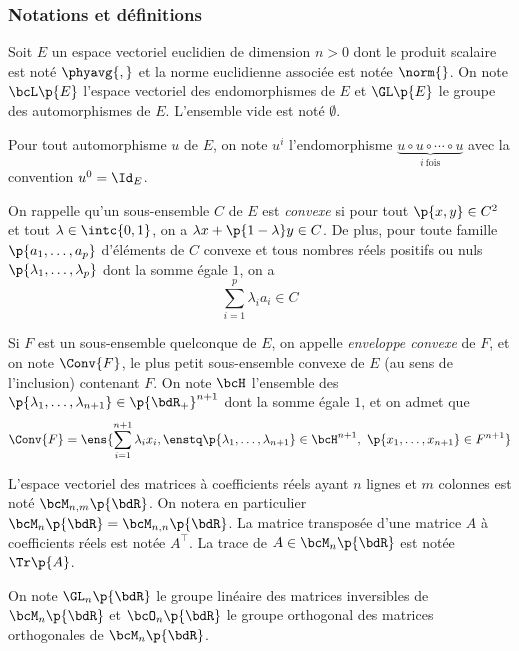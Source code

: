 \documentclass[a4paper,french,bookmarks]{article}
\begin{document}
    \renewcommand{\thesection}{\Roman{section}}
    \renewcommand{\thesubsection}{\Roman{section}.\Alph{subsection}}
    \renewcommand{\labelenumi}{\thesection.\arabic{enumi}.}
    \renewcommand*{\labelenumii}{\alph{enumii})}

    
    \subsubsection*{Notations et définitions}
    
    \begin{enumerate}
        \itt Soit $E$ un espace vectoriel euclidien de dimension $n > 0$ dont le produit scalaire est noté $\phyavg{,}$ et la norme euclidienne associée est notée $\norm{}$. On note $\bcL\p{E}$ l'espace vectoriel des endomorphismes de $E$ et $\GL\p{E}$ le groupe des automorphismes de $E$. L'ensemble vide est noté $\emptyset$. 
        
        \itt Pour tout automorphisme $u$ de $E$, on note $u^i$ l'endomorphisme $\underbrace{u \circ u \circ \cdots \circ u}_{i \ \text{fois}}$ avec la convention $u^0 = \Id_E$. 
        
        \itt On rappelle qu'un sous-ensemble $C$ de $E$ est \emph{convexe} si pour tout $\p{x, y} \in C^2$ et tout $\lambda \in \intc{0, 1}$, on a $\lambda x + \p{1 - \lambda}y \in C$. De plus, pour toute famille $\p{a_1, \dots, a_p}$ d'éléments de $C$ convexe et tous nombres réels positifs ou nuls $\p{\lambda_1, \dots, \lambda_p}$ dont la somme égale $1$, on a
        \[ \displaystyle \sum_{i=1}^p \lambda_i a_i \in C \]
        
        \itt Si $F$ est un sous-ensemble quelconque de $E$, on appelle \emph{enveloppe convexe} de $F$, et on note $\Conv{F}$, le plus petit sous-ensemble convexe de $E$ (au sens de l'inclusion) contenant $F$. On note $\bcH$ l'ensemble des $\p{\lambda_1, \dots, \lambda_{n+1}} \in \p{\bdR_+}^{n+1}$ dont la somme égale $1$, et on admet que 
        \[ \Conv{F} = \ens{\sum_{i=1}^{n+1} \lambda_i x_i,\enstq \p{\lambda_1, \dots, \lambda_{n+1}} \in \bcH^{n+1},\ \p{x_1, \dots, x_{n+1}}\in F^{n+1}} \]
        
        \itt L'espace vectoriel des matrices à coefficients réels ayant $n$ lignes et $m$ colonnes est noté $\bcM_{n, m}\p{\bdR}$. On notera en particulier $\bcM_n\p{\bdR} = \bcM_{n, n}\p{\bdR}$. La matrice transposée d'une matrice $A$ à coefficients réels est notée $A^\top$. La trace de $A \in \bcM_n\p{\bdR}$ est notée $\Tr\p{A}$. 
        
        \itt On note $\GL_n\p{\bdR}$ le groupe linéaire des matrices inversibles de $\bcM_n\p{\bdR}$ et $\bcO_n\p{\bdR}$ le groupe orthogonal des matrices orthogonales de $\bcM_n\p{\bdR}$.
    \end{enumerate}
    
\end{document}
